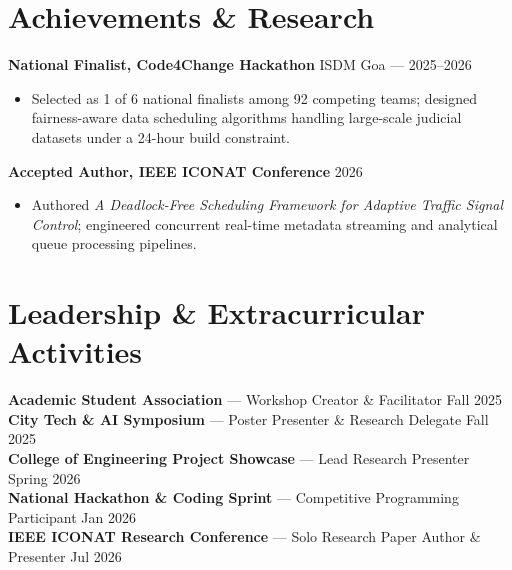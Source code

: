 \documentclass[a4paper,10pt]{article}
\begin{document}
\vspace{2pt}


\section*{Achievements \& Research}

\textbf{National Finalist, Code4Change Hackathon} \hfill ISDM Goa --- 2025--2026
\begin{itemize}
\item Selected as 1 of 6 national finalists among 92 competing teams; designed fairness-aware data scheduling algorithms handling large-scale judicial datasets under a 24-hour build constraint.
\end{itemize}

\textbf{Accepted Author, IEEE ICONAT Conference} \hfill 2026
\begin{itemize}
\item Authored \textit{A Deadlock-Free Scheduling Framework for Adaptive Traffic Signal Control}; engineered concurrent real-time metadata streaming and analytical queue processing pipelines.
\end{itemize}


\section*{Leadership \& Extracurricular Activities}

\textbf{Academic Student Association} --- Workshop Creator \& Facilitator \hfill Fall 2025\\
\textbf{City Tech \& AI Symposium} --- Poster Presenter \& Research Delegate \hfill Fall 2025\\
\textbf{College of Engineering Project Showcase} --- Lead Research Presenter \hfill Spring 2026\\
\textbf{National Hackathon \& Coding Sprint} --- Competitive Programming Participant \hfill Jan 2026\\
\textbf{IEEE ICONAT Research Conference} --- Solo Research Paper Author \& Presenter \hfill Jul 2026
\end{document}
